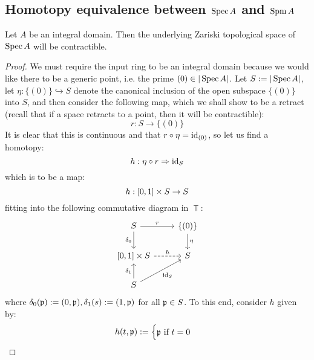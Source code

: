         \subsection{Homotopy equivalence between \texorpdfstring{$\Spec A$ and $\Spm A$}{}}
            \begin{lemma} \label{lemma: spectra_of_integral_domains_are_contractible}
                Let $A$ be an integral domain. Then the underlying Zariski topological space of $\Spec A$ will be contractible.
            \end{lemma}
                \begin{proof}
                    We must require the input ring to be an integral domain because we would like there to be a generic point, i.e. the prime $(0) \in |\Spec A|$. Let $S := |\Spec A|$, let $\eta: \{(0)\} \hookrightarrow S$ denote the canonical inclusion of the open subspace $\{(0)\}$ into $S$, and then consider the following map, which we shall show to be a retract (recall that if a space retracts to a point, then it will be contractible):
                        $$r: S \to \{(0)\}$$
                    It is clear that this is continuous and that $r \circ \eta = \id_{(0)}$, so let us find a homotopy:
                        $$h: \eta \circ r \Rightarrow \id_S$$
                    which is to be a map:
                        $$h: [0, 1] \x S \to S$$
                    fitting into the following commutative diagram in $\Top$:
                        $$
                            \begin{tikzcd}
                        	S & {\{(0)\}} \\
                        	{[0, 1] \x S} & S \\
                        	S
                        	\arrow["r", from=1-1, to=1-2]
                        	\arrow["{\delta_0}"', from=1-1, to=2-1]
                        	\arrow["\eta", from=1-2, to=2-2]
                        	\arrow["h", dashed, from=2-1, to=2-2]
                        	\arrow["{\delta_1}", from=3-1, to=2-1]
                        	\arrow["{\id_S}"', from=3-1, to=2-2]
                            \end{tikzcd}
                        $$
                    where $\delta_0(\p) := (0, \p), \delta_1(s) := (1, \p)$ for all $\p \in S$. To this end, consider $h$ given by:
                        $$h
                            (t, \p) := 
                            \begin{cases}
                                \text{$\p$ if $t = 0$}
                                \\

\end{cases}$$
\end{proof}
